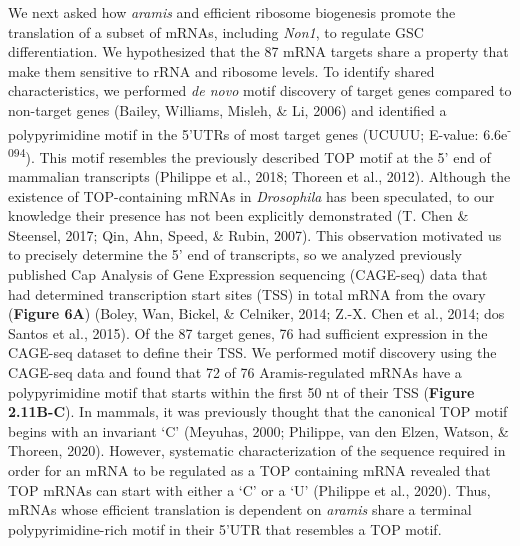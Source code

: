 \documentclass[12pt,oneside]{reedthesis}
\begin{document}
We next asked how \emph{aramis} and efficient ribosome biogenesis promote the translation of a subset of mRNAs, including \emph{Non1}, to regulate GSC differentiation. We hypothesized that the 87 mRNA targets share a property that make them sensitive to rRNA and ribosome levels. To identify shared characteristics, we performed \emph{de novo} motif discovery of target genes compared to non-target genes (Bailey, Williams, Misleh, \& Li, 2006) and identified a polypyrimidine motif in the 5'UTRs of most target genes (UCUUU; E-value: 6.6e\textsuperscript{-094}). This motif resembles the previously described TOP motif at the 5' end of mammalian transcripts (Philippe et al., 2018; Thoreen et al., 2012). Although the existence of TOP-containing mRNAs in \emph{Drosophila} has been speculated, to our knowledge their presence has not been explicitly demonstrated (T. Chen \& Steensel, 2017; Qin, Ahn, Speed, \& Rubin, 2007). This observation motivated us to precisely determine the 5' end of transcripts, so we analyzed previously published Cap Analysis of Gene Expression sequencing (CAGE-seq) data that had determined transcription start sites (TSS) in total mRNA from the ovary (\textbf{Figure 6A}) (Boley, Wan, Bickel, \& Celniker, 2014; Z.-X. Chen et al., 2014; dos Santos et al., 2015). Of the 87 target genes, 76 had sufficient expression in the CAGE-seq dataset to define their TSS. We performed motif discovery using the CAGE-seq data and found that 72 of 76 Aramis-regulated mRNAs have a polypyrimidine motif that starts within the first 50 nt of their TSS (\textbf{Figure 2.11B-C}). In mammals, it was previously thought that the canonical TOP motif begins with an invariant `C' (Meyuhas, 2000; Philippe, van den Elzen, Watson, \& Thoreen, 2020). However, systematic characterization of the sequence required in order for an mRNA to be regulated as a TOP containing mRNA revealed that TOP mRNAs can start with either a `C' or a `U' (Philippe et al., 2020). Thus, mRNAs whose efficient translation is dependent on \emph{aramis} share a terminal polypyrimidine-rich motif in their 5'UTR that resembles a TOP motif.
\end{document}
